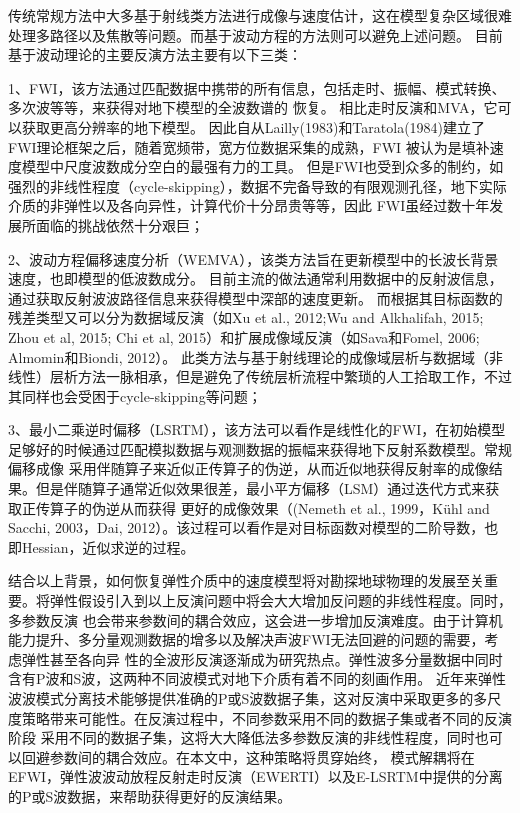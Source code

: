 传统常规方法中大多基于射线类方法进行成像与速度估计，这在模型复杂区域很难处理多路径以及焦散等问题。而基于波动方程的方法则可以避免上述问题。
目前基于波动理论的主要反演方法主要有以下三类：

1、FWI，该方法通过匹配数据中携带的所有信息，包括走时、振幅、模式转换、多次波等等，来获得对地下模型的全波数谱的
恢复。
相比走时反演和MVA，它可以获取更高分辨率的地下模型。
因此自从Lailly(1983)\cite{lailly1983seismic}和Taratola(1984)\cite{tarantola1984}建立了FWI理论框架之后，随着宽频带，宽方位数据采集的成熟，FWI
被认为是填补速度模型中尺度波数成分空白的最强有力的工具。
但是FWI也受到众多的制约，如强烈的非线性程度（cycle-skipping），数据不完备导致的有限观测孔径，地下实际介质的非弹性以及各向异性，计算代价十分昂贵等等，因此
FWI虽经过数十年发展所面临的挑战依然十分艰巨；

2、波动方程偏移速度分析（WEMVA），该类方法旨在更新模型中的长波长背景速度，也即模型的低波数成分。
目前主流的做法通常利用数据中的反射波信息，通过获取反射波波路径信息来获得模型中深部的速度更新。
而根据其目标函数的残差类型又可以分为数据域反演（如Xu et al., 2012\cite{xu:2012};Wu and Alkhalifah, 2015\cite[]{Wu2015}; Zhou et al, 
2015\cite[]{zhou:2015}; Chi et al, 2015\cite{chi:2015}）和扩展成像域反演（如Sava和Fomel, 2006\cite{Sava2006}; Almomin和Biondi, 2012\cite{Almomin2012}）。
此类方法与基于射线理论的成像域层析与数据域（非线性）层析方法一脉相承，但是避免了传统层析流程中繁琐的人工拾取工作，不过其同样也会受困于cycle-skipping等问题；

3、最小二乘逆时偏移（LSRTM），该方法可以看作是线性化的FWI，在初始模型足够好的时候通过匹配模拟数据与观测数据的振幅来获得地下反射系数模型。常规偏移成像
采用伴随算子来近似正传算子的伪逆，从而近似地获得反射率的成像结果。但是伴随算子通常近似效果很差，最小平方偏移（LSM）通过迭代方式来获取正传算子的伪逆从而获得
更好的成像效果（(Nemeth et al., 1999，Kühl and Sacchi, 2003，Dai, 2012）。该过程可以看作是对目标函数对模型的二阶导数，也即Hessian，近似求逆的过程。

结合以上背景，如何恢复弹性介质中的速度模型将对勘探地球物理的发展至关重要。将弹性假设引入到以上反演问题中将会大大增加反问题的非线性程度。同时，多参数反演
也会带来参数间的耦合效应，这会进一步增加反演难度。由于计算机能力提升、多分量观测数据的增多以及解决声波FWI无法回避的问题的需要，考虑弹性甚至各向异
性的全波形反演逐渐成为研究热点。弹性波多分量数据中同时含有P波和S波，这两种不同波模式对地下介质有着不同的刻画作用。
近年来弹性波波模式分离技术能够提供准确的P或S波数据子集，这对反演中采取更多的多尺度策略带来可能性。在反演过程中，不同参数采用不同的数据子集或者不同的反演阶段
采用不同的数据子集，这将大大降低法多参数反演的非线性程度，同时也可以回避参数间的耦合效应。在本文中，这种策略将贯穿始终，
模式解耦将在EFWI，弹性波波动放程反射走时反演（EWERTI）以及E-LSRTM中提供的分离的P或S波数据，来帮助获得更好的反演结果。
